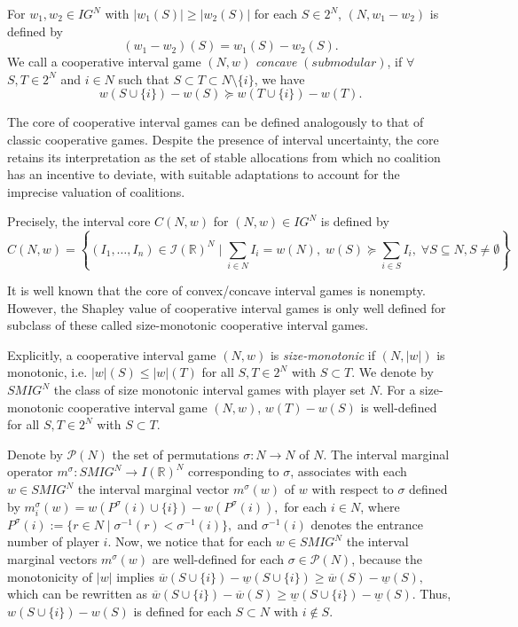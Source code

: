 \documentclass[12pt]{article}
\begin{document}
\noindent For $w_{1},w_{2}\in IG^{N}$ with $|w_{1}(S)|\geq |w_{2}(S)|$ for
each $S\in 2^{N}$, $(N,w_{1}-w_{2})$ is defined by 
\begin{equation*}
(w_{1}-w_{2})(S)=w_{1}(S)-w_{2}(S).
\end{equation*}%
\noindent We call a cooperative interval game $(N,w)$ \textit{concave }$%
\left( submodular\right) $, if $\forall $ $S,T\in 2^{N}$ and $i\in N$ such that 
$S\subset T\subset N\setminus \{i\}$, we have 
\begin{equation*}
w(S\cup \{i\})-w(S)\succeq w(T\cup \{i\})-w(T).
\end{equation*}

The core of cooperative interval games can be defined analogously to that of classic cooperative games. Despite the presence of interval uncertainty, the core retains its interpretation as the set of stable allocations from which no coalition has an incentive to deviate, with suitable adaptations to account for the imprecise valuation of coalitions.

Precisely, the interval core $C(N,w)$ for $(N,w)\in IG^{N}$ is defined by  
\begin{equation*}
C(N,w)=\left\{ (I_{1},\dots ,I_{n})\in \mathcal{I}(\mathbb{R}%
)^{N}\;|\;\sum_{i\in N}I_{i}=w(N),\;w(S)\succeq \sum_{i\in S}I_{i},\;\forall
S \subseteq N, S \neq \emptyset\right\}
\end{equation*}

It is well known that the core of convex/concave interval games is nonempty. However, the Shapley value of cooperative interval games is only well defined for subclass of these called size-monotonic cooperative interval games. 

Explicitly, a cooperative interval game $(N,w)$ is \textit{size-monotonic} if $%
(N,|w|)$ is monotonic, i.e. $|w|(S)\leq |w|(T)$ for all $S,T\in 2^{N}$ with $%
S\subset T$. We denote by $SMIG^{N}$ the class of size
monotonic interval games with player set $N$. For a size-monotonic
cooperative interval game $(N,w)$, $w(T)-w(S)$ is well-defined for all $%
S,T\in 2^{N}$  with $S\subset T$.   

\noindent Denote by $\mathcal{P}(N)$ the set of permutations $\sigma
:N\rightarrow N$ of $N$. The interval marginal operator $m^{\sigma
}:SMIG^{N}\rightarrow I(\mathbb{R})^{N}$ corresponding to $\sigma $,
associates with each $w\in SMIG^{N}$ the interval marginal vector $m^{\sigma
}(w)$ of $w$ with respect to $\sigma $ defined by $m_{i}^{\sigma
}(w)=w(P^{\sigma }(i)\cup \{i\})-w(P^{\sigma }(i)),$ for each $i\in N$,
where $P^{\sigma }(i):=\{r\in N\mid \sigma ^{-1}(r)<\sigma ^{-1}(i)\},$ and $%
\sigma ^{-1}(i)$ denotes the entrance number of player $i$. Now, we notice
that for each $w\in SMIG^{N}$ the interval marginal vectors $m^{\sigma }(w)$
are well-defined for each $\sigma \in \mathcal{P}(N)$, because the
monotonicity of $|w|$ implies $\overline{w}(S\cup \{i\})-\underline{w}(S\cup
\{i\})\geq \overline{w}(S)-\underline{w}(S),$ which can be rewritten as  $%
\overline{w}(S\cup \{i\})-\overline{w}(S)\geq \underline{w}(S\cup \{i\})-%
\underline{w}(S).$ Thus, $w(S\cup \{i\})-w(S)$ is defined for each $S\subset
N$ with $i\notin S$.
\end{document}

